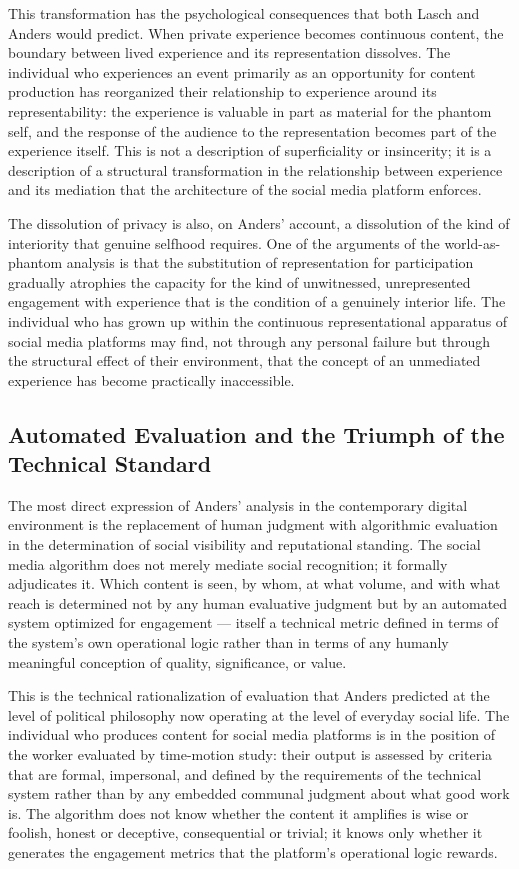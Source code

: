 \documentclass[12pt]{memoir}
\begin{document}
This transformation has the psychological consequences that both Lasch and Anders would
predict. When private experience becomes continuous content, the boundary between lived
experience and its representation dissolves. The individual who experiences an event primarily
as an opportunity for content production has reorganized their relationship to experience
around its representability: the experience is valuable in part as material for the phantom
self, and the response of the audience to the representation becomes part of the experience
itself. This is not a description of superficiality or insincerity; it is a description of a
structural transformation in the relationship between experience and its mediation that the
architecture of the social media platform enforces.

The dissolution of privacy is also, on Anders' account, a dissolution of the kind of interiority
that genuine selfhood requires. One of the arguments of the world-as-phantom analysis is that
the substitution of representation for participation gradually atrophies the capacity for the
kind of unwitnessed, unrepresented engagement with experience that is the condition of a
genuinely interior life. The individual who has grown up within the continuous representational
apparatus of social media platforms may find, not through any personal failure but through
the structural effect of their environment, that the concept of an unmediated experience has
become practically inaccessible.

\subsection{Automated Evaluation and the Triumph of the Technical Standard}

The most direct expression of Anders' analysis in the contemporary digital environment is the
replacement of human judgment with algorithmic evaluation in the determination of social
visibility and reputational standing. The social media algorithm does not merely mediate social
recognition; it formally adjudicates it. Which content is seen, by whom, at what volume, and
with what reach is determined not by any human evaluative judgment but by an automated system
optimized for engagement — itself a technical metric defined in terms of the system's own
operational logic rather than in terms of any humanly meaningful conception of quality,
significance, or value.

This is the technical rationalization of evaluation that Anders predicted at the level of
political philosophy now operating at the level of everyday social life. The individual who
produces content for social media platforms is in the position of the worker evaluated by
time-motion study: their output is assessed by criteria that are formal, impersonal, and
defined by the requirements of the technical system rather than by any embedded communal
judgment about what good work is. The algorithm does not know whether the content it amplifies
is wise or foolish, honest or deceptive, consequential or trivial; it knows only whether it
generates the engagement metrics that the platform's operational logic rewards.
\end{document}

